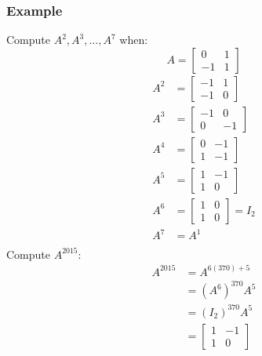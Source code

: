\documentclass[letterpaper, 12pt]{math}
\begin{document}
\subsubsection*{Example}
Compute \( A^2,A^3,\dots,A^7 \) when:
\[ A = \begin{bmatrix}0 & 1 \\ -1 & 1\end{bmatrix} \]
\begin{align*}
  A^2 &= \begin{bmatrix}-1 & 1 \\ -1 & 0\end{bmatrix} \\
  A^3 &= \begin{bmatrix}-1 & 0 \\ 0 & -1\end{bmatrix} \\
  A^4 &= \begin{bmatrix}0 & -1 \\ 1 & -1\end{bmatrix} \\
  A^5 &= \begin{bmatrix}1 & -1 \\ 1 & 0\end{bmatrix} \\
  A^6 &= \begin{bmatrix}1 & 0 \\ 1 & 0\end{bmatrix} = I_2 \\
  A^7 &= A^1 \\
\end{align*}
Compute \( A^{2015} \):
\begin{align*}
  A^{2015} &= A^{6(370)+5} \\
  &= (A^6)^{370}A^5 \\
  &= (I_2)^{370}A^5 \\
  &= \begin{bmatrix}1 & -1 \\ 1 & 0\end{bmatrix}
\end{align*}
\end{document}
